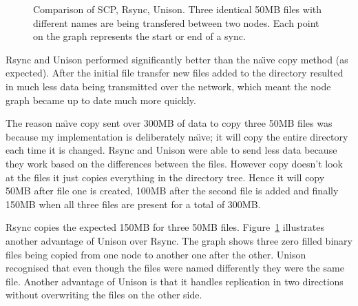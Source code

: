 \documentclass[12pt]{article}
\begin{document}
\begin{figure}[htp]
    \caption{Comparison of SCP, Rsync, Unison. Three identical 50MB files 
    with different names are being transfered between two nodes. Each
    point on the graph represents the start or end of a sync.}
    \label{fig:point_comp_graph}
\end{figure}

Rsync and Unison performed significantly better
than the na\"{\i}ve copy method (as expected). After the initial file
transfer new files added to the directory resulted in much less data
being transmitted over the network, which meant the node graph
became up to date much more quickly.

The reason na\"{\i}ve copy sent over 300MB of data to copy three 50MB
files was because my implementation is deliberately na\"{\i}ve; it will
copy the entire directory each time it is changed. Rsync and
Unison were able to send less data because they work based on the
differences between the files. However copy doesn't look at
the files it just copies everything in the directory tree.
Hence it will copy 50MB after file one is created, 100MB after
the second file is added and finally 150MB when all three
files are present for a total of 300MB.

Rsync copies the expected 150MB for three 50MB files.
Figure~\ref{fig:point_comp_graph} illustrates another advantage
of Unison over Rsync. The graph shows three zero filled
binary files being copied from one node to another one after
the other. Unison recognised that even though the files were named
differently they were the same file. Another advantage of Unison
is that it handles replication in two directions without
overwriting the files on the other side.
\end{document}
